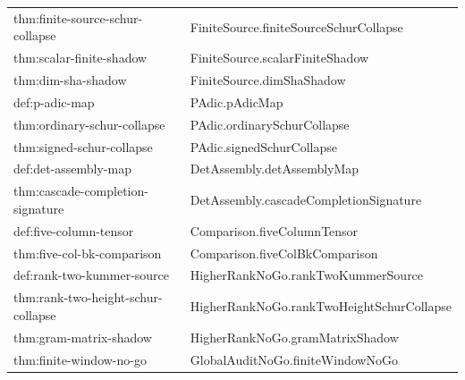 \documentclass[11pt]{article}
\theoremstyle{definition}
\begin{document}
\begin{small}
\begin{longtable}{@{}>{\ttfamily\raggedright\arraybackslash}p{} >{\ttfamily\raggedright\arraybackslash}p{}@{}}
thm:\allowbreak finite-\allowbreak source-\allowbreak schur-\allowbreak collapse & Finite\allowbreak Source.\allowbreak finite\allowbreak Source\allowbreak Schur\allowbreak Collapse \\
thm:\allowbreak scalar-\allowbreak finite-\allowbreak shadow & Finite\allowbreak Source.\allowbreak scalar\allowbreak Finite\allowbreak Shadow \\
thm:\allowbreak dim-\allowbreak sha-\allowbreak shadow & Finite\allowbreak Source.\allowbreak dim\allowbreak Sha\allowbreak Shadow \\
def:\allowbreak p-\allowbreak adic-\allowbreak map & PAdic.\allowbreak p\allowbreak Adic\allowbreak Map \\
thm:\allowbreak ordinary-\allowbreak schur-\allowbreak collapse & PAdic.\allowbreak ordinary\allowbreak Schur\allowbreak Collapse \\
thm:\allowbreak signed-\allowbreak schur-\allowbreak collapse & PAdic.\allowbreak signed\allowbreak Schur\allowbreak Collapse \\
def:\allowbreak det-\allowbreak assembly-\allowbreak map & Det\allowbreak Assembly.\allowbreak det\allowbreak Assembly\allowbreak Map \\
thm:\allowbreak cascade-\allowbreak completion-\allowbreak signature & Det\allowbreak Assembly.\allowbreak cascade\allowbreak Completion\allowbreak Signature \\
def:\allowbreak five-\allowbreak column-\allowbreak tensor & Comparison.\allowbreak five\allowbreak Column\allowbreak Tensor \\
thm:\allowbreak five-\allowbreak col-\allowbreak bk-\allowbreak comparison & Comparison.\allowbreak five\allowbreak Col\allowbreak Bk\allowbreak Comparison \\
def:\allowbreak rank-\allowbreak two-\allowbreak kummer-\allowbreak source & Higher\allowbreak Rank\allowbreak No\allowbreak Go.\allowbreak rank\allowbreak Two\allowbreak Kummer\allowbreak Source \\
thm:\allowbreak rank-\allowbreak two-\allowbreak height-\allowbreak schur-\allowbreak collapse & Higher\allowbreak Rank\allowbreak No\allowbreak Go.\allowbreak rank\allowbreak Two\allowbreak Height\allowbreak Schur\allowbreak Collapse \\
thm:\allowbreak gram-\allowbreak matrix-\allowbreak shadow & Higher\allowbreak Rank\allowbreak No\allowbreak Go.\allowbreak gram\allowbreak Matrix\allowbreak Shadow \\
thm:\allowbreak finite-\allowbreak window-\allowbreak no-\allowbreak go & Global\allowbreak Audit\allowbreak No\allowbreak Go.\allowbreak finite\allowbreak Window\allowbreak No\allowbreak Go \\

\end{longtable}
\end{small}
\end{document}
